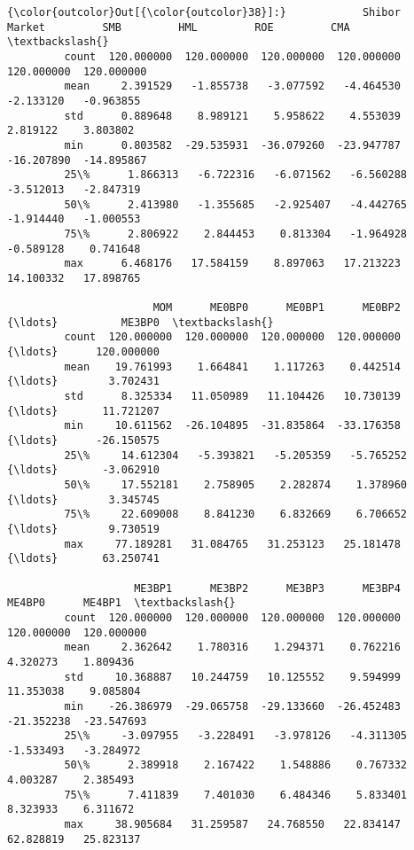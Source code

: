 \documentclass[11pt]{article}
\begin{document}
\begin{Verbatim}[commandchars=\\\{\}]
{\color{outcolor}Out[{\color{outcolor}38}]:}            Shibor      Market         SMB         HML         ROE         CMA  \textbackslash{}
         count  120.000000  120.000000  120.000000  120.000000  120.000000  120.000000   
         mean     2.391529   -1.855738   -3.077592   -4.464530   -2.133120   -0.963855   
         std      0.889648    8.989121    5.958622    4.553039    2.819122    3.803802   
         min      0.803582  -29.535931  -36.079260  -23.947787  -16.207890  -14.895867   
         25\%      1.866313   -6.722316   -6.071562   -6.560288   -3.512013   -2.847319   
         50\%      2.413980   -1.355685   -2.925407   -4.442765   -1.914440   -1.000553   
         75\%      2.806922    2.844453    0.813304   -1.964928   -0.589128    0.741648   
         max      6.468176   17.584159    8.897063   17.213223   14.100332   17.898765   
         
                       MOM      ME0BP0      ME0BP1      ME0BP2     {\ldots}          ME3BP0  \textbackslash{}
         count  120.000000  120.000000  120.000000  120.000000     {\ldots}      120.000000   
         mean    19.761993    1.664841    1.117263    0.442514     {\ldots}        3.702431   
         std      8.325334   11.050989   11.104426   10.730139     {\ldots}       11.721207   
         min     10.611562  -26.104895  -31.835864  -33.176358     {\ldots}      -26.150575   
         25\%     14.612304   -5.393821   -5.205359   -5.765252     {\ldots}       -3.062910   
         50\%     17.552181    2.758905    2.282874    1.378960     {\ldots}        3.345745   
         75\%     22.609008    8.841230    6.832669    6.706652     {\ldots}        9.730519   
         max     77.189281   31.084765   31.253123   25.181478     {\ldots}       63.250741   
         
                    ME3BP1      ME3BP2      ME3BP3      ME3BP4      ME4BP0      ME4BP1  \textbackslash{}
         count  120.000000  120.000000  120.000000  120.000000  120.000000  120.000000   
         mean     2.362642    1.780316    1.294371    0.762216    4.320273    1.809436   
         std     10.368887   10.244759   10.125552    9.594999   11.353038    9.085804   
         min    -26.386979  -29.065758  -29.133660  -26.452483  -21.352238  -23.547693   
         25\%     -3.097955   -3.228491   -3.978126   -4.311305   -1.533493   -3.284972   
         50\%      2.389918    2.167422    1.548886    0.767332    4.003287    2.385493   
         75\%      7.411839    7.401030    6.484346    5.833401    8.323933    6.311672   
         max     38.905684   31.259587   24.768550   22.834147   62.828819   25.823137   
         

\end{Verbatim}
\end{document}
